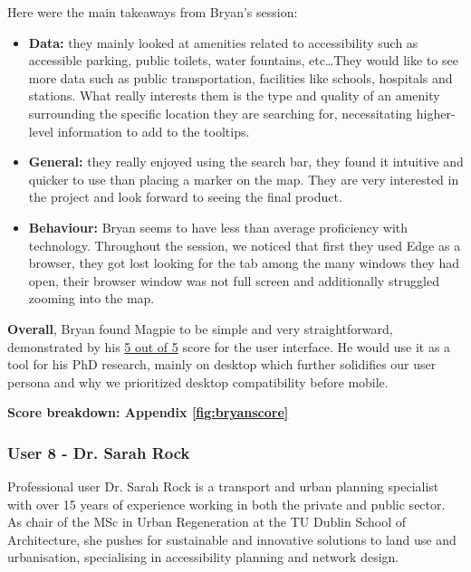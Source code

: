 Here were the main takeaways from Bryan's session:
\begin{itemize}
    \item \textbf{Data: }they mainly looked at amenities related to
          accessibility such as accessible parking, public toilets, water fountains,
          etc\ldots They would like to see more data such as public transportation,
          facilities like schools, hospitals and stations. What really interests them
          is the type and quality of an amenity surrounding the specific location they
          are searching for, necessitating higher-level information to add to the
          tooltips.
          
    \item \textbf{General: }they really enjoyed using the search bar, they found
          it intuitive and quicker to use than placing a marker on the map. They are
          very interested in the project and look forward to seeing the final
          product.
          
    \item \textbf{Behaviour: } Bryan seems to have less than average proficiency
          with technology. Throughout the session, we noticed that first they used
          Edge as a browser, they got lost looking for the tab among the many windows
          they had open, their browser window was not full screen and additionally
          struggled zooming into the map.
\end{itemize}

\textbf{Overall}, Bryan found Magpie to be simple and very straightforward,
demonstrated by his \underline{5 out of 5} score for the user interface. He
would use it as a tool for his PhD research, mainly on desktop which further
solidifies our user persona and why we prioritized desktop compatibility before
mobile.

\hspace{2em}\textbf{Score breakdown: Appendix \ref{fig:bryanscore}}

\newpage{}
\subsubsection{User 8 - Dr. Sarah Rock}
Professional user Dr. Sarah Rock is a transport and urban planning specialist
with over 15 years of experience working in both the private and public sector.
As chair of the MSc in Urban Regeneration at the TU Dublin School of
Architecture, she pushes for sustainable and innovative solutions to land use
and urbanisation, specialising in accessibility planning and network design.

